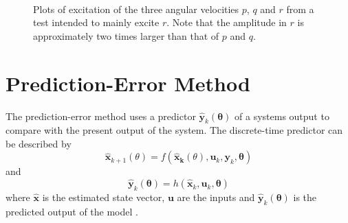\begin{figure}[htbp]
  \centering
  \qquad
  \\
  \caption{\label{fig:rTest}%
 Plots of excitation of the three angular velocities $p$, $q$ and $r$ from a test intended to mainly excite $r$. Note that the amplitude in $r$ is approximately two times larger than that of $p$ and $q$.}
\end{figure}
\section{Prediction-Error Method}  
The prediction-error method uses a predictor $\hat{\boldsymbol{y}}_k(\boldsymbol{\theta})$ of a systems output to compare with the present output of the system. The discrete-time predictor can be described by 
\begin{equation}
\hat{\boldsymbol{x}}_{k+1}(\theta) = f(\boldsymbol{\hat{x}_k}(\theta), \boldsymbol{u}_k,\boldsymbol{y}_k, \boldsymbol{\theta})
\end{equation}
and
\begin{equation}
\hat{\boldsymbol{y}}_k(\boldsymbol{\theta}) = h(\hat{\boldsymbol{x}}_k, \boldsymbol{u}_k, \boldsymbol{\theta})
\end{equation}
where $\hat{\boldsymbol{x}}$ is the estimated state vector, $\boldsymbol{u}$ are the inputs and $\hat{\boldsymbol{y}}_k(\boldsymbol{\theta})$ is the predicted output of the model \citep[p. 13]{Roger}. 

